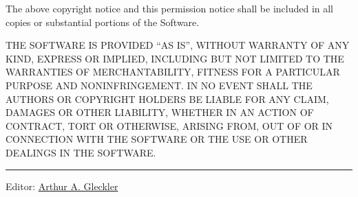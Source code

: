 The above copyright notice and this permission notice shall be included
in all copies or substantial portions of the Software.

THE SOFTWARE IS PROVIDED ``AS IS'', WITHOUT WARRANTY OF ANY KIND,
EXPRESS OR IMPLIED, INCLUDING BUT NOT LIMITED TO THE WARRANTIES OF
MERCHANTABILITY, FITNESS FOR A PARTICULAR PURPOSE AND NONINFRINGEMENT.
IN NO EVENT SHALL THE AUTHORS OR COPYRIGHT HOLDERS BE LIABLE FOR ANY
CLAIM, DAMAGES OR OTHER LIABILITY, WHETHER IN AN ACTION OF CONTRACT,
TORT OR OTHERWISE, ARISING FROM, OUT OF OR IN CONNECTION WITH THE
SOFTWARE OR THE USE OR OTHER DEALINGS IN THE SOFTWARE.

\begin{center}\rule{0.5\linewidth}{\linethickness}\end{center}

Editor:
\href{mailto:srfi-editors\%20at\%20srfi\%20dot\%20schemers\%20dot\%20org}{Arthur
A. Gleckler}
